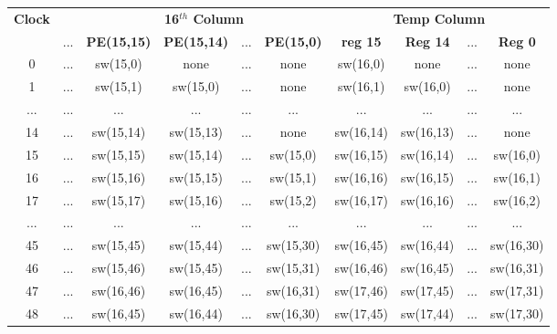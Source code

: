\begin{table}[H]
	\centering
	\begin{tabular}{|c|c|c|c|c|c|c|c|c|c|}
		\hline
		\textbf{Clock} &  &  \multicolumn{4}{c|}{\textbf{16$^{th}$ Column}} &  \multicolumn{4}{c|}{\textbf{Temp Column}}  \\
		\cline{3-10}
		& ... & \textbf{PE(15,15)} & \textbf{PE(15,14)} & ... & \textbf{PE(15,0)} & \textbf{reg 15} & \textbf{Reg 14} & ... & \textbf{Reg 0}  \\
		\hline
		0 & ... & sw(15,0) & none & ... & none & sw(16,0) & none & ... & none  \\
		
		1 & ... & sw(15,1) & sw(15,0) & ... & none & sw(16,1) & sw(16,0) & ... & none  \\
		
		... & ... & ... & ... & ... & ... & ... & ... & ... & ... \\
		
		14 & ... & sw(15,14) & sw(15,13) & ... & none & sw(16,14) & sw(16,13) & ... & none \\ 
		
		15 & ... & sw(15,15) & sw(15,14) & ... & sw(15,0) & sw(16,15) & sw(16,14) & ... & sw(16,0)  \\
		
		\hline
		
		16 & ... & sw(15,16) & sw(15,15) & ... & sw(15,1) & sw(16,16) & sw(16,15) & ... & sw(16,1) \\
		
		17 & ... & sw(15,17) & sw(15,16) & ... & sw(15,2) & sw(16,17) & sw(16,16) & ... & sw(16,2) \\
		
		... & ... & ... & ... & ... & ... & ... & ... & ... & ... \\
		
		45 & ... & sw(15,45) & sw(15,44) & ... & sw(15,30) & sw(16,45) & sw(16,44) & ... & sw(16,30) \\
		
		46 & ... & sw(15,46) & sw(15,45) & ... & sw(15,31) & sw(16,46) & sw(16,45) & ... & sw(16,31)  \\
		
		\hline
		
		47 & ... & sw(16,46) & sw(16,45) & ... & sw(16,31) & sw(17,46) & sw(17,45) & ... & sw(17,31) \\
		
		48 & ... & sw(16,45) & sw(16,44) & ... & sw(16,30) & sw(17,45) & sw(17,44) & ... & sw(17,30) \\
		

\end{tabular}
\end{table}
